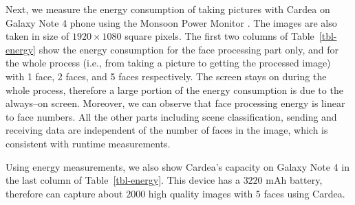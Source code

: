 Next, we measure the energy consumption of taking pictures with Cardea on Galaxy Note 4 phone using the Monsoon Power Monitor \cite{links:powermonitor}. The images are also taken in size of $1920 \times 1080$ square pixels. The first two columns of Table~\ref{tbl-energy} show the energy consumption for the face processing part only, and for the whole process (i.e., from taking a picture to getting the processed image) with 1 face, 2 faces, and 5 faces respectively. The screen stays on during the whole process, therefore a large portion of the energy consumption is due to the always--on screen. Moreover, we can observe that face processing energy is linear to face numbers. All the other parts including scene classification, sending and receiving data are independent of the number of faces in the image, which is consistent with runtime measurements.

Using energy measurements, we also show Cardea's capacity on Galaxy Note 4 in the last column of Table~\ref{tbl-energy}. This device has a $3220$ mAh battery, therefore can capture about $2000$ high quality images with $5$ faces using Cardea.



\newpage
